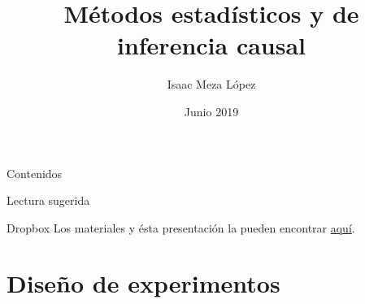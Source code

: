 \documentclass[8pt]{beamer}
\title{Métodos estadísticos y de inferencia causal}
\author{Isaac Meza López\inst{1}}
\institute[ITAM] %
{
  \inst{1}%
  ITAM
  
}
\date{Junio 2019}
\begin{document}
\begin{frame}
  \titlepage
\end{frame}

\begin{frame}[allowframebreaks]{Contenidos}
  \tableofcontents
\end{frame}

\nocite{*}
\begin{frame}[allowframebreaks]{Lectura sugerida}


\end{frame}

\begin{frame}{Dropbox}
    Los materiales y ésta presentación la pueden encontrar \color{blue}\href{https://github.com/isaacmeza/metodos_estadisticos}{aquí}.
\end{frame}


\section{Diseño de experimentos}
\end{document}
